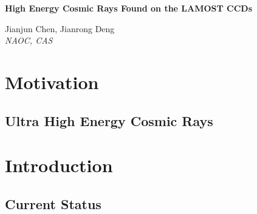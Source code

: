 \documentclass[12pt,twoside,letterpaper]{article}
\begin{document}
\begin{center}
  \begin{Large}
  {\bf High Energy Cosmic Rays Found on the LAMOST CCDs}
  \end{Large}
\end{center}

\begin{center}
\small{Jianjun Chen, Jianrong Deng}\vspace{1.0ex} \\
\emph{NAOC, CAS}
\end{center}


\begin{abstract}

\end{abstract}

\section{Motivation} 

\subsection{Ultra High Energy Cosmic Rays} 

\section{Introduction} 

\subsection{Current Status} 
\end{document}
